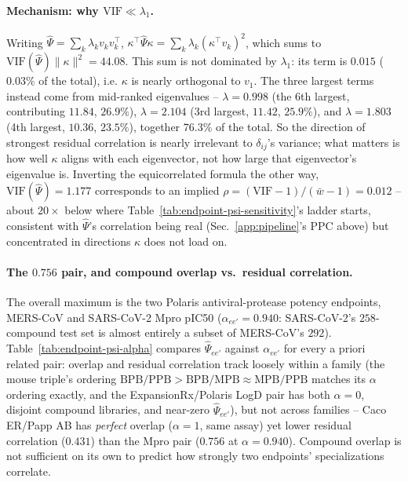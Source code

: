 \documentclass{article}
\begin{document}
\paragraph{Mechanism: why $\mathrm{VIF} \ll \lambda_1$.} Writing $\hat\Psi = \sum_k \lambda_k v_kv_k^\top$,
$\kappa^\top\hat\Psi\kappa = \sum_k \lambda_k(\kappa^\top v_k)^2$, which sums to
$\mathrm{VIF}(\hat\Psi)\|\kappa\|^2 = 44.08$. This sum is not dominated by $\lambda_1$: its term is $0.015$
($0.03\%$ of the total), i.e. $\kappa$ is nearly orthogonal to $v_1$. The three largest terms instead come from
mid-ranked eigenvalues -- $\lambda=0.998$ (the 6th largest, contributing $11.84$, $26.9\%$), $\lambda=2.104$
(3rd largest, $11.42$, $25.9\%$), and $\lambda=1.803$ (4th largest, $10.36$, $23.5\%$), together $76.3\%$ of the
total. So the direction of strongest residual correlation is nearly irrelevant to $\delta_{ij}$'s variance;
what matters is how well $\kappa$ aligns with each eigenvector, not how large that eigenvector's eigenvalue is.
Inverting the equicorrelated formula the other way, $\mathrm{VIF}(\hat\Psi) = 1.177$ corresponds to an implied
$\rho = (\mathrm{VIF}-1)/(\bar w - 1) = 0.012$ -- about $20\times$ below where Table~\ref{tab:endpoint-psi-sensitivity}'s
ladder starts, consistent with $\hat\Psi$'s correlation being real (Sec.~\ref{app:pipeline}'s PPC above) but
concentrated in directions $\kappa$ does not load on.

\paragraph{The $0.756$ pair, and compound overlap vs.\ residual correlation.} The overall maximum is the two
Polaris antiviral-protease potency endpoints, MERS-CoV and SARS-CoV-2 Mpro pIC50 ($\alpha_{ee'}=0.940$: SARS-CoV-2's
$258$-compound test set is almost entirely a subset of MERS-CoV's $292$). Table~\ref{tab:endpoint-psi-alpha}
compares $\hat\Psi_{ee'}$ against $\alpha_{ee'}$ for every a priori related pair: overlap and residual
correlation track loosely within a family (the mouse triple's ordering $\text{BPB/PPB} > \text{BPB/MPB} \approx
\text{MPB/PPB}$ matches its $\alpha$ ordering exactly, and the ExpansionRx/Polaris LogD pair has both
$\alpha=0$, disjoint compound libraries, and near-zero $\hat\Psi_{ee'}$), but not across families -- Caco
ER/Papp AB has \emph{perfect} overlap ($\alpha=1$, same assay) yet lower residual correlation ($0.431$) than
the Mpro pair ($0.756$ at $\alpha=0.940$). Compound overlap is not sufficient on its own to predict how
strongly two endpoints' specializations correlate.
\end{document}
